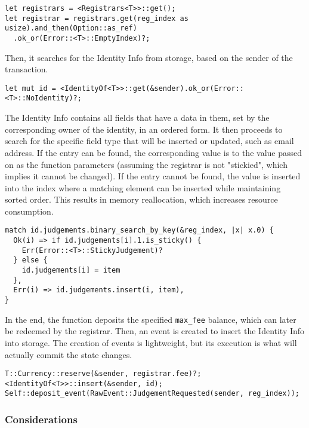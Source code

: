 \documentclass[11pt,a4paper]{article}
\begin{document}
\begin{verbatim}
let registrars = <Registrars<T>>::get();
let registrar = registrars.get(reg_index as usize).and_then(Option::as_ref)
  .ok_or(Error::<T>::EmptyIndex)?;
\end{verbatim}

Then, it searches for the Identity Info from storage, based on the sender of the
transaction.

\begin{verbatim}
let mut id = <IdentityOf<T>>::get(&sender).ok_or(Error::<T>::NoIdentity)?;
\end{verbatim}

The Identity Info contains all fields that have a data in them, set by the
corresponding owner of the identity, in an ordered form. It then proceeds to
search for the specific field type that will be inserted or updated, such as
email address. If the entry can be found, the corresponding value is to the
value passed on as the function parameters (assuming the registrar is not
"stickied", which implies it cannot be changed). If the entry cannot be found,
the value is inserted into the index where a matching element can be inserted
while maintaining sorted order. This results in memory reallocation, which
increases resource consumption.

\begin{verbatim}
match id.judgements.binary_search_by_key(&reg_index, |x| x.0) {
  Ok(i) => if id.judgements[i].1.is_sticky() {
    Err(Error::<T>::StickyJudgement)?
  } else {
    id.judgements[i] = item
  },
  Err(i) => id.judgements.insert(i, item),
}
\end{verbatim}

In the end, the function deposits the specified \verb|max_fee| balance, which
can later be redeemed by the registrar. Then, an event is created to insert the
Identity Info into storage. The creation of events is lightweight, but its
execution is what will actually commit the state changes.

\begin{verbatim}
T::Currency::reserve(&sender, registrar.fee)?;
<IdentityOf<T>>::insert(&sender, id);
Self::deposit_event(RawEvent::JudgementRequested(sender, reg_index));
\end{verbatim}

\subsubsection{Considerations}
\end{document}

